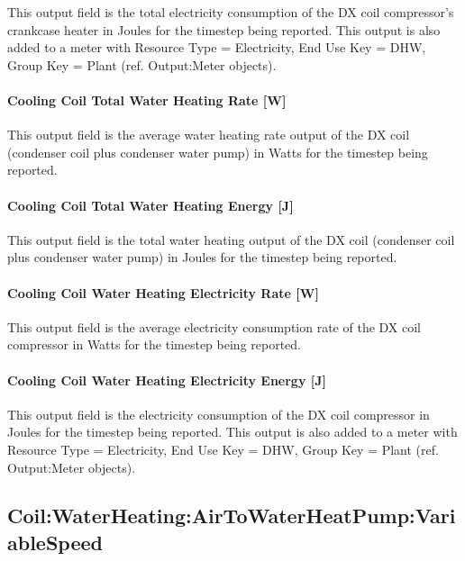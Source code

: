 This output field is the total electricity consumption of the DX coil compressor's crankcase heater in Joules for the timestep being reported. This output is also added to a meter with Resource Type = Electricity, End Use Key = DHW, Group Key = Plant (ref. Output:Meter objects).

\paragraph{Cooling Coil Total Water Heating Rate {[}W{]}}\label{heating-coil-total-water-heating-rate-w-1}

This output field is the average water heating rate output of the DX coil (condenser coil plus condenser water pump) in Watts for the timestep being reported.

\paragraph{Cooling Coil Total Water Heating Energy {[}J{]}}\label{heating-coil-total-water-heating-energy-j-1}

This output field is the total water heating output of the DX coil (condenser coil plus condenser water pump) in Joules for the timestep being reported.

\paragraph{Cooling Coil Water Heating Electricity Rate {[}W{]}}\label{heating-coil-water-heating-electric-powerw-1}

This output field is the average electricity consumption rate of the DX coil compressor in Watts for the timestep being reported.

\paragraph{Cooling Coil Water Heating Electricity Energy {[}J{]}}\label{heating-coil-water-heating-electric-energy-j-1}

This output field is the electricity consumption of the DX coil compressor in Joules for the timestep being reported. This output is also added to a meter with Resource Type = Electricity, End Use Key = DHW, Group Key = Plant (ref. Output:Meter objects).



\subsection{Coil:WaterHeating:AirToWaterHeatPump:VariableSpeed}\label{coil-waterheating-airtowaterheatpump-variablespeed}

